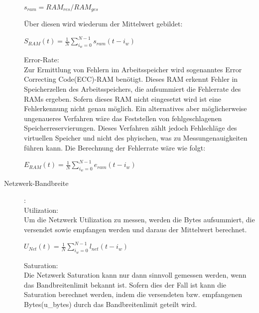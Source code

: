 \documentclass[a4paper,10pt]{scrartcl}
\begin{document}
\begin{description}
\begin{minipage}{\linewidth}
\(
\displaystyle{s_{ram}=RAM_{res}/RAM_{ges}}
\) 
\end{minipage}

Über diesen wird wiederum der Mittelwert gebildet:\\

\begin{minipage}{\linewidth}
\(
\displaystyle{S_{RAM}(t)=\frac{1}{N}{\sum\limits_{i_{w}=0}^{N-1} s_{ram}{(t-i_{w})}} }
\) 
\end{minipage}

Error-Rate:\\
Zur Ermittlung von Fehlern im Arbeitsspeicher wird sogenanntes \glqq Error Correcting Code\grqq(ECC)-RAM benötigt. Dieses RAM erkennt Fehler in Speicherzellen des Arbeitsspeichers, die aufsummiert die Fehlerrate des RAMs ergeben. Sofern dieses RAM nicht eingesetzt wird ist eine Fehlerkennung nicht genau möglich. Ein alternatives aber möglicherweise ungenaueres Verfahren wäre das Feststellen von fehlgeschlagenen Speicherreservierungen. Dieses Verfahren zählt jedoch Fehlschläge des virtuellen Speicher und nicht des phyischen, was zu Messungenauigkeiten führen kann.
Die Berechnung der Fehlerrate wäre wie folgt:\\

\begin{minipage}{\linewidth}
\(
\displaystyle{E_{RAM}(t)=\frac{1}{N}{\sum\limits_{i_{w}=0}^{N-1} e_{ram}{(t-i_{w})}} }
\) 
\end{minipage}

\pagebreak

\item[Netzwerk-Bandbreite]:\\
Utilization:\\
Um die Netzwerk Utilization zu messen, werden die Bytes aufsummiert, die versendet sowie empfangen werden und daraus der Mittelwert berechnet.\\

\begin{minipage}{\linewidth}
\(
\displaystyle{U_{Net}(t)=\frac{1}{N}{\sum\limits_{i_{w}=0}^{N-1} l_{net}{(t-i_{w})}} }
\) 
\end{minipage}

Saturation:\\
Die Netzwerk Saturation kann nur dann sinnvoll gemessen werden, wenn das Bandbreitenlimit bekannt ist. Sofern dies der Fall ist kann die Saturation berechnet werden, indem die versendeten bzw. empfangenen Bytes(u\_bytes) durch das Bandbreitenlimit geteilt wird. \\


\end{description}
\end{document}
